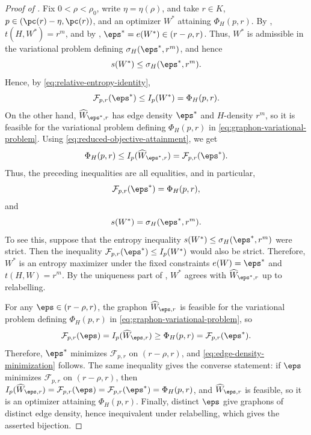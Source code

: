 \begin{proof}[Proof of ]
Fix $0<\rho<\rho_0$, write $\eta=\eta(\rho)$, and take
$r\in K$, $p\in(\pc(r)-\eta,\pc(r))$, and an optimizer $W^*$ attaining
$\Phi_H(p,r)$.  By , $t(H,W^*)=r^m$, and by
,
$\eps^*=e(W^*)\in(r-\rho,r)$.  Thus, $W^*$ is admissible in the variational
problem defining $\sigma_H(\eps^*,r^m)$, and hence
\[
  s(W^*)\le\sigma_H(\eps^*,r^m).
\]
Hence, by \eqref{eq:relative-entropy-identity},
\[
  \mathcal F_{p,r}(\eps^*)\le I_p(W^*)=\Phi_H(p,r).
\]
On the other hand, $\widehat W_{\eps^*,r}$ has edge density $\eps^*$ and
$H$-density $r^m$, so it is feasible for the variational problem defining
$\Phi_H(p,r)$ in \eqref{eq:graphon-variational-problem}.  Using
\eqref{eq:reduced-objective-attainment}, we get
\[
  \Phi_H(p,r)\le I_p(\widehat W_{\eps^*,r})=\mathcal F_{p,r}(\eps^*).
\]
Thus, the preceding inequalities are all equalities, and in particular,
\[
  \mathcal F_{p,r}(\eps^*)=\Phi_H(p,r),
\]
and
\[
  s(W^*)=\sigma_H(\eps^*,r^m).
\]
To see this, suppose that the entropy inequality
$s(W^*)\le\sigma_H(\eps^*,r^m)$ were strict.  Then the inequality
$\mathcal F_{p,r}(\eps^*)\le I_p(W^*)$ would also be strict.  Therefore,
$W^*$ is an entropy maximizer under the fixed constraints
$e(W)=\eps^*$ and $t(H,W)=r^m$.  By the uniqueness part of
, $W^*$ agrees with $\widehat W_{\eps^*,r}$ up to relabelling.

For any $\eps\in(r-\rho,r)$, the graphon $\widehat W_{\eps,r}$ is feasible for the
variational problem defining $\Phi_H(p,r)$ in \eqref{eq:graphon-variational-problem}, so
\[
  \mathcal F_{p,r}(\eps)=I_p(\widehat W_{\eps,r})\ge\Phi_H(p,r)
  =\mathcal F_{p,r}(\eps^*).
\]
Therefore, $\eps^*$ minimizes $\mathcal F_{p,r}$ on $(r-\rho,r)$, and
\eqref{eq:edge-density-minimization} follows.  The same inequality gives the converse
statement: if $\eps$ minimizes $\mathcal F_{p,r}$ on $(r-\rho,r)$, then
$I_p(\widehat W_{\eps,r})=\mathcal F_{p,r}(\eps)=\mathcal F_{p,r}(\eps^*)
=\Phi_H(p,r)$, and $\widehat W_{\eps,r}$ is feasible, so it is an optimizer
attaining $\Phi_H(p,r)$.
Finally, distinct $\eps$ give graphons of distinct edge density, hence
inequivalent under relabelling, which gives the asserted bijection.
\end{proof}